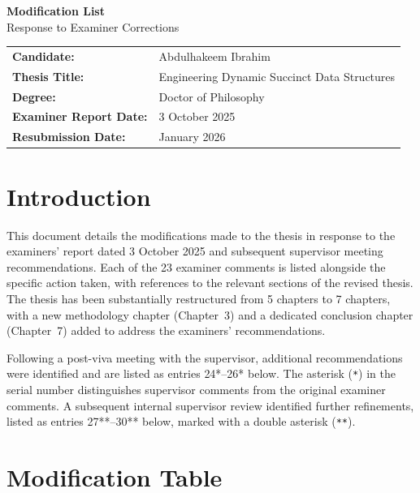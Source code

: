 \documentclass[12pt,a4paper]{article}
\begin{document}
\begin{center}
    {\LARGE \textbf{Modification List}}\\[0.5cm]
    {\Large Response to Examiner Corrections}\\[1cm]
    \begin{tabular}{@{}ll@{}}
        \textbf{Candidate:}       & Abdulhakeem Ibrahim \\[4pt]
        \textbf{Thesis Title:}    & Engineering Dynamic Succinct Data Structures \\[4pt]
        \textbf{Degree:}          & Doctor of Philosophy \\[4pt]
        \textbf{Examiner Report Date:} & 3 October 2025 \\[4pt]
        \textbf{Resubmission Date:}    & January 2026 \\
    \end{tabular}
\end{center}

\vspace{1cm}

\section*{Introduction}

This document details the modifications made to the thesis in response to the examiners' report dated 3 October 2025 and subsequent supervisor meeting recommendations. Each of the 23 examiner comments is listed alongside the specific action taken, with references to the relevant sections of the revised thesis. The thesis has been substantially restructured from 5 chapters to 7 chapters, with a new methodology chapter (Chapter~3) and a dedicated conclusion chapter (Chapter~7) added to address the examiners' recommendations.

Following a post-viva meeting with the supervisor, additional recommendations were identified and are listed as entries 24*--26* below. The asterisk (\texttt{*}) in the serial number distinguishes supervisor comments from the original examiner comments. A subsequent internal supervisor review identified further refinements, listed as entries 27**--30** below, marked with a double asterisk (\texttt{**}).

\vspace{0.5cm}

\section*{Modification Table}
\end{document}
